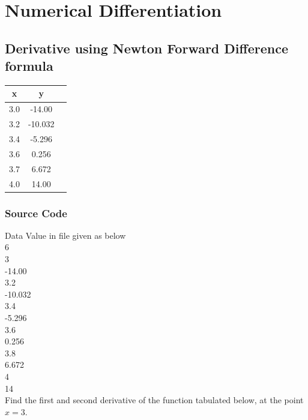 \documentclass{article}
\begin{document}
\section{Numerical Differentiation}
\subsection{Derivative using Newton Forward Difference formula}
\begin{center}
\begin{tabular}{ |c|c|c| } 
\hline
 x & y\\
 \hline
 3.0 & -14.00  \\  \hline
 3.2 & -10.032  \\  \hline
 3.4 & -5.296 \\  \hline
 3.6 & 0.256  \\  \hline
 3.7 & 6.672 \\  \hline
 4.0 & 14.00\\ \hline
 
 \hline
\end{tabular}
\end{center}
\subsubsection{Source Code}
Data Value in file given as below\\
6\\
3\\
-14.00\\
3.2\\
-10.032\\
3.4\\
-5.296\\
3.6\\
0.256\\
3.8\\
6.672\\
4\\
14\\
Find the first and second derivative of the function tabulated below, at the point $x=3$.
\end{document}
